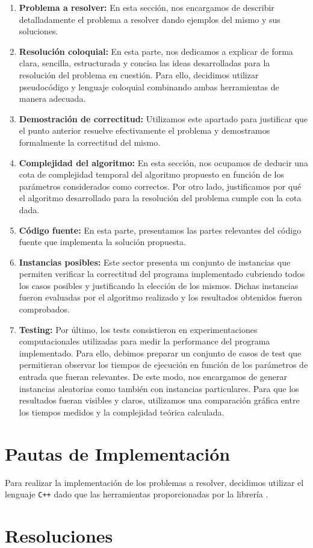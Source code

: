 \documentclass[10pt, a4paper]{article}
\begin{document}
\begin{enumerate}
\item \textbf{Problema a resolver:} En esta sección, nos encargamos de describir detalladamente el problema a resolver dando ejemplos del mismo y sus soluciones.
\item \textbf{Resolución coloquial:} En esta parte, nos dedicamos a explicar de forma clara, sencilla, estructurada y concisa las ideas desarrolladas para la resolución del problema en cuestión. Para ello, decidimos utilizar pseudocódigo y lenguaje coloquial combinando ambas herramientas de manera adecuada.
\item \textbf{Demostración de correctitud:} Utilizamos este apartado para justificar que el punto anterior resuelve efectivamente el problema y demostramos formalmente la correctitud del mismo.
\item \textbf{Complejidad del algoritmo:} En esta sección, nos ocupamos de deducir una cota de complejidad temporal del algoritmo propuesto en función de los parámetros considerados como correctos. Por otro lado, justificamos por qué el algoritmo desarrollado para la resolución del problema cumple con la cota dada.
\item \textbf{Código fuente:} En esta parte, presentamos las partes relevantes del código fuente que implementa la solución propuesta.
\item \textbf{Instancias posibles:} Este sector presenta un conjunto de instancias que permiten verificar la correctitud del programa implementado cubriendo todos los casos posibles y justificando la elección de los mismos. Dichas instancias fueron evaluadas por el algoritmo realizado y los resultados obtenidos fueron comprobados.
\item \textbf{Testing:} Por último, los tests consistieron en experimentaciones computacionales utilizadas para medir la performance del programa implementado. Para ello, debimos preparar un conjunto de casos de test que permitieran observar los tiempos de ejecución en función de los parámetros de entrada que fueran relevantes. De este modo, nos encargamos de generar instancias aleatorias como también con instancias particulares. Para que los resultados fueran visibles y claros, utilizamos una comparación gráfica entre los tiempos medidos y la complejidad teórica calculada.
\end{enumerate}

\section{Pautas de Implementaci\'on} 
 Para realizar la implementación de los problemas a resolver, decidimos utilizar el lenguaje \verb*#C++# dado que las herramientas proporcionadas por la librería .
\newpage

\section{Resoluciones}
%
\newpage

%
\newpage

%
\newpage
\end{document}
